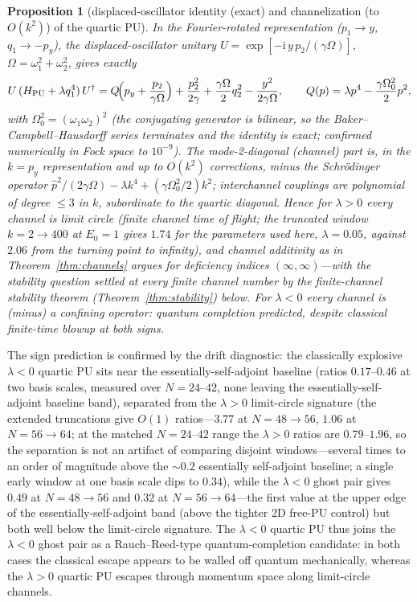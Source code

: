 \documentclass[11pt]{article}
\newtheorem{proposition}[theorem]{Proposition}
\theoremstyle{definition}
\theoremstyle{remark}
\newcommand{\ii}{\mathrm{i}}
\newcommand{\esa}{essentially self-adjoint}
\begin{document}
\begin{proposition}[displaced-oscillator identity (exact) and
channelization (to $O(k^2)$) of the quartic PU]
\label{prop:bo}
In the Fourier-rotated representation ($p_1\to y$, $q_1\to-p_y$), the
displaced-oscillator unitary $U=\exp[-\ii\,y\,p_2/(\gamma\Omega)]$,
$\Omega=\omega_1^2+\omega_2^2$, gives \emph{exactly}
\begin{equation}
U\,(H_{\rm PU}+\lambda q_1^4)\,U^{\dagger}
=Q\!\Bigl(p_y+\frac{p_2}{\gamma\Omega}\Bigr)
+\frac{p_2^{2}}{2\gamma}+\frac{\gamma\Omega}{2}q_2^{2}
-\frac{y^{2}}{2\gamma\Omega},
\qquad
Q(p)=\lambda p^{4}-\frac{\gamma\Omega_0^{2}}{2}p^{2},
\end{equation}
with $\Omega_0^2=(\omega_1\omega_2)^2$ (the conjugating generator is bilinear, so
the Baker--Campbell--Hausdorff series terminates and the identity is exact;
confirmed numerically in Fock space to $10^{-9}$). The
mode-2-diagonal (channel) part is, in the $k=p_y$ representation and up
to $O(k^{2})$ corrections, \emph{minus} the Schr\"odinger operator
$\hat p^{2}/(2\gamma\Omega)-\lambda k^{4}+(\gamma\Omega_0^{2}/2)k^{2}$;
interchannel couplings are polynomial of degree $\le3$ in $k$,
subordinate to the quartic diagonal. Hence for $\lambda>0$ every channel
is limit circle (finite channel time of flight; the truncated window
$k=2\to400$ at $E_{0}=1$ gives $1.74$ for the parameters used here,
$\lambda=0.05$, against $2.06$ from the turning point to infinity), and
channel additivity as in Theorem~\ref{thm:channels}
argues for deficiency indices $(\infty,\infty)$---with the stability
question settled at every finite channel number by the finite-channel
stability theorem (Theorem~\ref{thm:stability}) below. For
$\lambda<0$ every channel is (minus) a confining operator: quantum
completion predicted, \emph{despite} classical finite-time blowup at both
signs.
\end{proposition}

The sign prediction is confirmed by the drift diagnostic: the classically
explosive $\lambda<0$ quartic PU sits near the essentially-self-adjoint
baseline (ratios $0.17$--$0.46$ at two basis scales, measured over
$N=24$--$42$, none leaving
the essentially-self-adjoint baseline band), separated from the
$\lambda>0$ limit-circle signature
(the extended truncations give $O(1)$ ratios---$3.77$ at
$N=48{\to}56$, $1.06$ at $N=56{\to}64$; at the matched
$N=24$--$42$ range the $\lambda>0$ ratios are $0.79$--$1.96$, so the
separation is not an artifact of comparing disjoint windows---several times to an order
of magnitude
above the ${\sim}0.2$ \esa{} baseline; a single
early window at one basis scale dips to
$0.34$), while the $\lambda<0$ ghost pair
gives $0.49$ at $N=48{\to}56$ and $0.32$ at $N=56{\to}64$---the
first value at the upper edge of the essentially-self-adjoint band
(above the tighter 2D free-PU control) but both well below the
limit-circle signature. The $\lambda<0$ quartic PU thus joins the $\lambda<0$ ghost pair
as a Rauch--Reed-type quantum-completion candidate: in both cases the
classical escape appears to be walled off quantum mechanically, whereas
the $\lambda>0$ quartic PU escapes through momentum space along
limit-circle channels.
\end{document}
